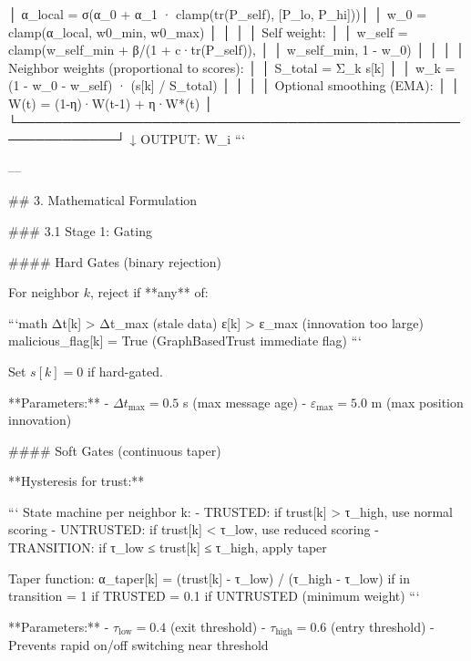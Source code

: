 │    α_local = σ(α_0 + α_1 · clamp(tr(P_self), [P_lo, P_hi]))│
│    w_0 = clamp(α_local, w0_min, w0_max)                     │
│                                                              │
│  Self weight:                                                │
│    w_self = clamp(w_self_min + β/(1 + c·tr(P_self)),       │
│                   w_self_min, 1 - w_0)                       │
│                                                              │
│  Neighbor weights (proportional to scores):                 │
│    S_total = Σ_k s[k]                                       │
│    w_k = (1 - w_0 - w_self) · (s[k] / S_total)             │
│                                                              │
│  Optional smoothing (EMA):                                  │
│    W(t) = (1-η)·W(t-1) + η·W*(t)                           │
└─────────────────────────────────────────────────────────────┘
                          ↓
                     OUTPUT: W_i
```

---

## 3. Mathematical Formulation

### 3.1 Stage 1: Gating

#### Hard Gates (binary rejection)

For neighbor \(k\), reject if **any** of:

```math
Δt[k] > Δt_max                    (stale data)
ε[k] > ε_max                       (innovation too large)
malicious_flag[k] = True           (GraphBasedTrust immediate flag)
```

Set \(s[k] = 0\) if hard-gated.

**Parameters:**
- \(Δt_{\text{max}} = 0.5\) s (max message age)
- \(\varepsilon_{\text{max}} = 5.0\) m (max position innovation)

#### Soft Gates (continuous taper)

**Hysteresis for trust:**

```
State machine per neighbor k:
  - TRUSTED: if trust[k] > τ_high, use normal scoring
  - UNTRUSTED: if trust[k] < τ_low, use reduced scoring
  - TRANSITION: if τ_low ≤ trust[k] ≤ τ_high, apply taper

Taper function:
  α_taper[k] = (trust[k] - τ_low) / (τ_high - τ_low)   if in transition
             = 1                                         if TRUSTED
             = 0.1                                       if UNTRUSTED (minimum weight)
```

**Parameters:**
- \(\tau_{\text{low}} = 0.4\) (exit threshold)
- \(\tau_{\text{high}} = 0.6\) (entry threshold)
- Prevents rapid on/off switching near threshold

